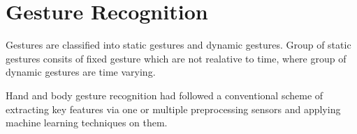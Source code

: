 \section{Gesture Recognition}
Gestures are classified into static gestures and dynamic gestures. Group of static gestures consits of fixed gesture which are not realative to time, where group of dynamic gestures are time varying.

Hand and body gesture recognition had followed a conventional scheme of extracting key features via one or multiple preprocessing sensors and applying machine learning techniques on them.\cite{avola}
